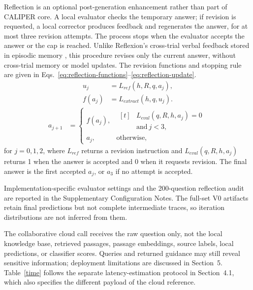 \documentclass[a4paper,fleqn]{cas-dc}
\begin{document}
Reflection is an optional post-generation enhancement rather than part of CALIPER core. A local evaluator checks the temporary answer; if revision is requested, a local corrector produces feedback and regenerates the answer, for at most three revision attempts. The process stops when the evaluator accepts the answer or the cap is reached. Unlike Reflexion's cross-trial verbal feedback stored in episodic memory \cite{shinn2023reflexion}, this procedure revises only the current answer, without cross-trial memory or model updates. The revision functions and stopping rule are given in Eqs.~\eqref{eq:reflection-functions}--\eqref{eq:reflection-update}.
\begin{equation}\label{eq:reflection-functions}
\begin{aligned}
u_j&=L_{ref}(h,R,q,a_j),\\
f(a_j)&=L_{extract}(h,q,u_j).
\end{aligned}
\end{equation}
\begin{equation}\label{eq:reflection-update}
\begin{aligned}
a_{j+1}&=
\begin{cases}
f(a_j), & \begin{aligned}[t]
          &L_{eval}(q,R,h,a_j)=0\\
          &\mathrm{and}\ j<3,
          \end{aligned}\\
a_j, & \mathrm{otherwise},
\end{cases}
\end{aligned}
\end{equation}
for \(j=0,1,2\), where \(L_{ref}\) returns a revision instruction and \(L_{eval}(q,R,h,a_j)\) returns 1 when the answer is accepted and 0 when it requests revision. The final answer is the first accepted \(a_j\), or \(a_3\) if no attempt is accepted.

Implementation-specific evaluator settings and the 200-question reflection audit are reported in the Supplementary Configuration Notes. The full-set V0 artifacts retain final predictions but not complete intermediate traces, so iteration distributions are not inferred from them.

The collaborative cloud call receives the raw question only, not the local knowledge base, retrieved passages, passage embeddings, source labels, local predictions, or classifier scores. Queries and returned guidance may still reveal sensitive information; deployment limitations are discussed in Section~5. Table~\ref{time} follows the separate latency-estimation protocol in Section~4.1, which also specifies the different payload of the cloud reference.
\end{document}
